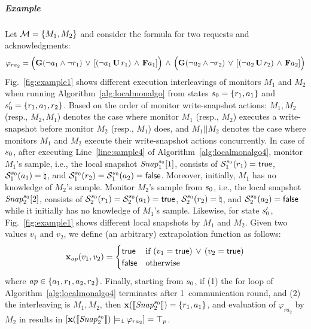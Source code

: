 \subparagraph{Example}
Let $\mathcal{M} = \{M_1, M_2\}$ and consider the formula for two requests and  
acknowledgments: 
\[
\varphi_{ra_2} = \Big(\mathbf{G}(\neg a_1 \wedge \neg r_1) \, \vee \, [(\neg a_1 \, 
\mathbf{U} \, r_1) \, \wedge \, \mathbf{F} a_1]\Big)\, \wedge \, \Big(\mathbf{G}(\neg a_2 \wedge \neg 
r_2) \, \vee \, [(\neg a_2 \, \mathbf{U} \, r_2) \,\wedge \, \mathbf{F} a_2]\Big)
\]
Fig.~\ref{fig:example1} shows different execution interleavings of monitors 
$M_1$ and $M_2$ when running Algorithm~\ref{alg:localmonalgo} from states 
$s_0  = \{r_1, a_1\}$ and $s_0' = \{r_1, a_1, r_2\}$. Based on the 
order of monitor write-snapshot actions: $M_1, M_2$ (resp., $M_2, M_1$) denotes 
the case where monitor $M_1$ (resp., $M_2$) executes a write-snapshot before 
monitor $M_2$ (resp., $M_1$) does, and $M_1|| M_2$ denotes the case where 
monitors $M_1$ and $M_2$ execute their write-snapshot actions concurrently. In 
case of $s_0$, after executing Line~\ref{line:sample4} of 
Algorithm~\ref{alg:localmonalgo4}, monitor $M_1$'s sample, i.e., the local 
snapshot $\mathit{Snap}_1^{s_0}[1]$, consists of $\mathcal{S}_1^{s_0}(r_1) = \mathsf{true}$,  
$\mathcal{S}_1^{s_0}(a_1) = \natural$, and $\mathcal{S}_1^{s_0}(r_2) = 
\mathcal{S}_1^{s_0}(a_2) = \mathsf{false}$. Moreover, initially, $M_1$ has no knowledge 
of $M_2$'s sample. Monitor $M_2$'s sample from $s_0$, i.e., the local 
snapshot $\mathit{Snap}_2^{s_0}[2]$, consists of $\mathcal{S}_2^{s_0}(r_1) = 
\mathcal{S}_2^{s_0}(a_1) = \mathsf{true}$, $\mathcal{S}_2^{s_0}(r_2)=\natural$, and 
$\mathcal{S}_2^{s_0}(a_2)= \mathsf{false}$ while it initially has no knowledge of 
$M_1$'s sample. Likewise, for state $s'_0$, Fig.~\ref{fig:example1} 
shows different local snapshots by $M_1$ and $M_2$. Given two values $v_1$ and 
$v_2$, we define (an arbitrary) extrapolation function as follows:
\begin{equation*}
\mathbf{x}_{\mathit{ap}}(v_1, v_2) = \begin{cases}
\mathsf{true}   & \mbox{if } (v_1=\mathsf{true})  \, \vee \, (v_2=\mathsf{true}) \\
\mathsf{false} & \mbox{otherwise} \end{cases} 
\end{equation*}
where $\mathit{ap} \in \{a_1, r_1, a_2, r_2\}$.
Finally, starting from $s_0$, if (1) the for loop of 
Algorithm~\ref{alg:localmonalgo4} terminates after 1~communication round, and 
(2) the interleaving is $M_1, M_2$, then $\mathbf{x}(\llbracket \mathit{Snap}_2^{s_0} \rrbracket) 
= \{r_1, a_1\}$, and  evaluation of $\varphi_{ra_2}$ by $M_2$ in \LTLfour 
results in $[\mathbf{x}(\llbracket \mathit{Snap}_2^{s_0} \rrbracket) \models_4 \varphi_{ra_2}] = 
\top_p$. 

